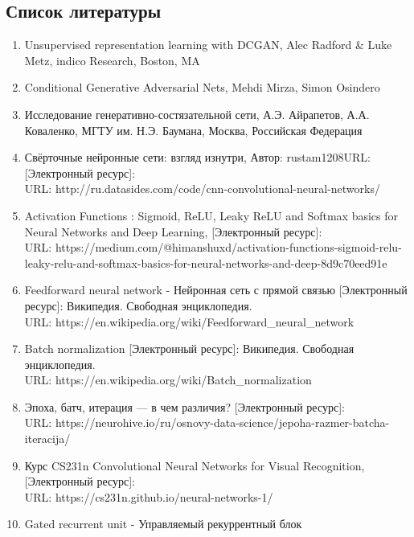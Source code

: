 \documentclass{article}
\begin{document}
    \newpage
    \begin{center} 
    \section{Список литературы}
    \end{center}
    \large
    \begin{enumerate} 
    \item Unsupervised representation learning with DCGAN, Alec Radford & Luke Metz, indico Research, Boston, MA
    \item Conditional Generative Adversarial Nets, Mehdi Mirza, Simon Osindero
    \item Исследование генеративно-состязательной сети, А.Э. Айрапетов, А.А. Коваленко, МГТУ им. Н.Э. Баумана, Москва, Российская Федерация
    \item Свёрточные нейронные сети: взгляд изнутри, Автор: rustam1208URL: [Электронный ресурс]: \\  URL: http://ru.datasides.com/code/cnn-convolutional-neural-networks/
    \item Activation Functions : Sigmoid, ReLU, Leaky ReLU and Softmax basics for Neural Networks and Deep Learning, [Электронный ресурс]: \\ URL: https://medium.com/@himanshuxd/activation-functions-sigmoid-relu-leaky-relu-and-softmax-basics-for-neural-networks-and-deep-8d9c70eed91e
    \item Feedforward neural network - Нейронная сеть с прямой связью [Электронный ресурс]: Википедия. Свободная энциклопедия.\\
    URL: https://en.wikipedia.org/wiki/Feedforward\_neural\_network
    \item Batch normalization [Электронный ресурс]: Википедия. Свободная энциклопедия.\\ URL: https://en.wikipedia.org/wiki/Batch\_normalization
    \item Эпоха, батч, итерация — в чем различия? [Электронный ресурс]:\\
    \indent URL: https://neurohive.io/ru/osnovy-data-science/jepoha-razmer-batcha-iteracija/
    \item Курс CS231n Convolutional Neural Networks for Visual Recognition, [Электронный ресурс]: \\ 
    URL: https://cs231n.github.io/neural-networks-1/
    \item Gated recurrent unit - Управляемый рекуррентный блок

\end{enumerate}
\end{document}

